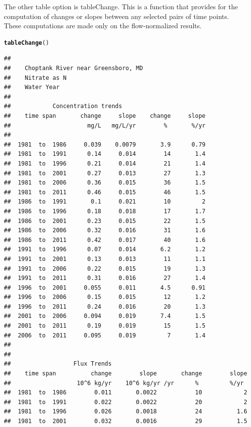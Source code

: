 \documentclass[a4paper,11pt]{article}\usepackage{graphicx, color}
\makeatletter
\newcommand{\hlfunctioncall}[1]{\textcolor[rgb]{0.501960784313725,0,0.329411764705882}{\textbf{#1}}}%
\newenvironment{kframe}{%
 \def\at@end@of@kframe{}%
 \ifinner\ifhmode%
  \def\at@end@of@kframe{\end{minipage}}%
  \begin{minipage}{\columnwidth}%
 \fi\fi%
 \def\FrameCommand##1{\hskip\@totalleftmargin \hskip-\fboxsep
 \colorbox{shadecolor}{##1}\hskip-\fboxsep
     \hskip-\linewidth \hskip-\@totalleftmargin \hskip\columnwidth}%
 \MakeFramed {\advance\hsize-\width
   \@totalleftmargin\z@ \linewidth\hsize
   \@setminipage}}%
 {\par\unskip\endMakeFramed%
 \at@end@of@kframe}
\newenvironment{knitrout}{}{} %
\makeatother
\begin{document}
\FloatBarrier

The other table option is tableChange. This is a function that provides for the computation of changes or slopes between any selected pairs of time points.  These computations are made only on the flow-normalized results.

\begin{knitrout}
\color{fgcolor}\begin{kframe}
\begin{alltt}
\hlfunctioncall{tableChange}()
\end{alltt}
\begin{verbatim}
## 
##    Choptank River near Greensboro, MD 
##    Nitrate as N
##    Water Year 
## 
##            Concentration trends
##    time span       change     slope    change     slope
##                      mg/L   mg/L/yr        %       %/yr
## 
##  1981  to  1986     0.039    0.0079       3.9      0.79
##  1981  to  1991      0.14     0.014        14       1.4
##  1981  to  1996      0.21     0.014        21       1.4
##  1981  to  2001      0.27     0.013        27       1.3
##  1981  to  2006      0.36     0.015        36       1.5
##  1981  to  2011      0.46     0.015        46       1.5
##  1986  to  1991       0.1     0.021        10         2
##  1986  to  1996      0.18     0.018        17       1.7
##  1986  to  2001      0.23     0.015        22       1.5
##  1986  to  2006      0.32     0.016        31       1.6
##  1986  to  2011      0.42     0.017        40       1.6
##  1991  to  1996      0.07     0.014       6.2       1.2
##  1991  to  2001      0.13     0.013        11       1.1
##  1991  to  2006      0.22     0.015        19       1.3
##  1991  to  2011      0.31     0.016        27       1.4
##  1996  to  2001     0.055     0.011       4.5      0.91
##  1996  to  2006      0.15     0.015        12       1.2
##  1996  to  2011      0.24     0.016        20       1.3
##  2001  to  2006     0.094     0.019       7.4       1.5
##  2001  to  2011      0.19     0.019        15       1.5
##  2006  to  2011     0.095     0.019         7       1.4
## 
## 
##                  Flux Trends
##    time span          change        slope       change        slope
##                   10^6 kg/yr    10^6 kg/yr /yr      %         %/yr
##  1981  to  1986        0.011       0.0022           10            2
##  1981  to  1991        0.022       0.0022           20            2
##  1981  to  1996        0.026       0.0018           24          1.6
##  1981  to  2001        0.032       0.0016           29          1.5

\end{verbatim}
\end{kframe}
\end{knitrout}
\end{document}
